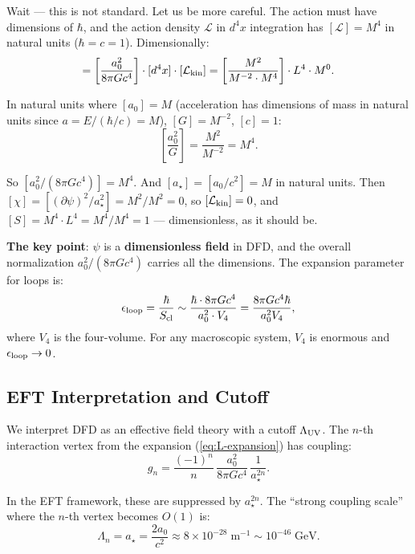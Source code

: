 \documentclass[11pt,a4paper]{article}
\begin{document}
Wait --- this is not standard. Let us be more careful. The action must have dimensions of $\hbar$, and the action density $\mathcal{L}$ in $d^4x$ integration has $[\mathcal{L}] = M^4$ in natural units ($\hbar = c = 1$). Dimensionally:
\begin{equation}
[S_\psi] = \left[\frac{a_0^2}{8\pi G c^4}\right]\cdot[d^4x]\cdot[\mathcal{L}_{\rm kin}]
= \left[\frac{M^2}{M^{-2}\cdot M^4}\right]\cdot L^4 \cdot M^0.
\end{equation}

In natural units where $[a_0] = M$ (acceleration has dimensions of mass in natural units since $a = E/(\hbar/c) = M$), $[G] = M^{-2}$, $[c] = 1$:
\begin{equation}
\left[\frac{a_0^2}{G}\right] = \frac{M^2}{M^{-2}} = M^4.
\end{equation}

So $[a_0^2/(8\pi G c^4)] = M^4$. And $[a_\star] = [a_0/c^2] = M$ in natural units. Then $[\chi] = [(\partial\psi)^2/a_\star^2] = M^2/M^2 = 0$, so $[\mathcal{L}_{\rm kin}] = 0$, and $[S] = M^4 \cdot L^4 = M^4/M^4 = 1$ --- dimensionless, as it should be.

\textbf{The key point}: $\psi$ is a \textbf{dimensionless field} in DFD, and the overall normalization $a_0^2/(8\pi G c^4)$ carries all the dimensions. The expansion parameter for loops is:
\begin{equation}
\epsilon_{\rm loop} = \frac{\hbar}{S_{\rm cl}} \sim \frac{\hbar \cdot 8\pi G c^4}{a_0^2 \cdot V_4}
= \frac{8\pi G c^4 \hbar}{a_0^2 V_4},
\end{equation}
where $V_4$ is the four-volume. For any macroscopic system, $V_4$ is enormous and $\epsilon_{\rm loop} \to 0$.

\subsection{EFT Interpretation and Cutoff}
\label{sec:cutoff}

We interpret DFD as an effective field theory with a cutoff $\Lambda_{\rm UV}$. The $n$-th interaction vertex from the expansion (\ref{eq:L-expansion}) has coupling:
\begin{equation}
g_n = \frac{(-1)^n}{n}\,\frac{a_0^2}{8\pi G c^4}\,\frac{1}{a_\star^{2n}}.
\end{equation}

In the EFT framework, these are suppressed by $a_\star^{2n}$. The ``strong coupling scale'' where the $n$-th vertex becomes $O(1)$ is:
\begin{equation}
\Lambda_n = a_\star = \frac{2a_0}{c^2} \approx 8\times 10^{-28}\;\text{m}^{-1}
\sim 10^{-46}\;\text{GeV}.
\end{equation}
\end{document}
